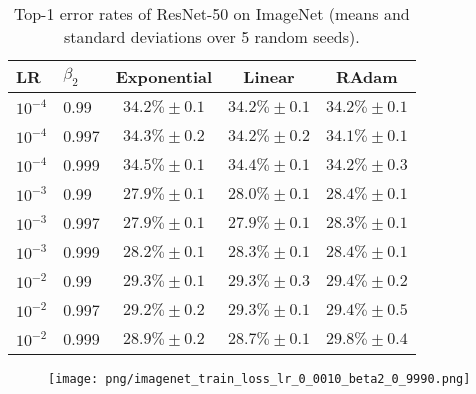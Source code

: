 {\begin{table}[ht]
\centering

\captionsetup{
  justification=centering,
  margin=0.25in
}

\scriptsize

\setlength{\tabcolsep}{3pt}

\begin{tabular}{l l | c c c}
  \toprule
  
  \textbf{LR} & \textbf{$\beta_2$} &          \textbf{Exponential} &               \textbf{Linear} &                \textbf{RAdam} \\
  
  \midrule
  
 $ {10}^{-4} $ &      0.99 &  $ 34.2 \% \pm 0.1 $ &  $ 34.2 \% \pm 0.1 $ &  $ 34.2 \% \pm 0.1 $ \\
 $ {10}^{-4} $ &     0.997 &  $ 34.3 \% \pm 0.2 $ &  $ 34.2 \% \pm 0.2 $ &  $ 34.1 \% \pm 0.1 $ \\
 $ {10}^{-4} $ &     0.999 &  $ 34.5 \% \pm 0.1 $ &  $ 34.4 \% \pm 0.1 $ &  $ 34.2 \% \pm 0.3 $ \\
 $ {10}^{-3} $ &      0.99 &  $ 27.9 \% \pm 0.1 $ &  $ 28.0 \% \pm 0.1 $ &  $ 28.4 \% \pm 0.1 $ \\
 $ {10}^{-3} $ &     0.997 &  $ 27.9 \% \pm 0.1 $ &  $ 27.9 \% \pm 0.1 $ &  $ 28.3 \% \pm 0.1 $ \\
 $ {10}^{-3} $ &     0.999 &  $ 28.2 \% \pm 0.1 $ &  $ 28.3 \% \pm 0.1 $ &  $ 28.4 \% \pm 0.1 $ \\
 $ {10}^{-2} $ &      0.99 &  $ 29.3 \% \pm 0.1 $ &  $ 29.3 \% \pm 0.3 $ &  $ 29.4 \% \pm 0.2 $ \\
 $ {10}^{-2} $ &     0.997 &  $ 29.2 \% \pm 0.2 $ &  $ 29.3 \% \pm 0.1 $ &  $ 29.4 \% \pm 0.5 $ \\
 $ {10}^{-2} $ &     0.999 &  $ 28.9 \% \pm 0.2 $ &  $ 28.7 \% \pm 0.1 $ &  $ 29.8 \% \pm 0.4 $ \\  
  \bottomrule
\end{tabular}

\caption{Top-1 error rates of ResNet-50 on ImageNet (means and standard deviations over 5 random seeds).}

\label{tbl:summary-imagenet}\end{table}

\begin{figure}[ht]
\centering

\captionsetup{
  justification=centering,
  margin=0.1in,
  size=normalsize
}

\texttt{[image: png/imagenet\_train\_loss\_lr\_0\_0010\_beta2\_0\_9990.png]}
  

\end{figure}}
